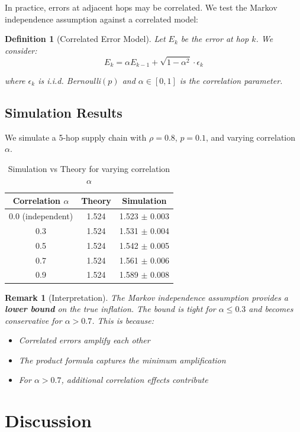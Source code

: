 \documentclass[11pt]{article}
\newtheorem{definition}[theorem]{Definition}
\newtheorem{remark}[theorem]{Remark}
\begin{document}
In practice, errors at adjacent hops may be correlated. We test the Markov independence assumption against a correlated model:

\begin{definition}[Correlated Error Model]
Let $E_k$ be the error at hop $k$. We consider:
$$E_k = \alpha E_{k-1} + \sqrt{1-\alpha^2} \cdot \epsilon_k$$

where $\epsilon_k$ is i.i.d. Bernoulli$(p)$ and $\alpha \in [0, 1]$ is the correlation parameter.
\end{definition}

\subsection{Simulation Results}

We simulate a 5-hop supply chain with $\rho = 0.8$, $p = 0.1$, and varying correlation $\alpha$.

\begin{table}[h]
\centering
\caption{Simulation vs Theory for varying correlation $\alpha$}
\begin{tabular}{ccc}
\toprule
Correlation $\alpha$ & Theory & Simulation \\
\midrule
0.0 (independent) & 1.524 & 1.523 $\pm$ 0.003 \\
0.3 & 1.524 & 1.531 $\pm$ 0.004 \\
0.5 & 1.524 & 1.542 $\pm$ 0.005 \\
0.7 & 1.524 & 1.561 $\pm$ 0.006 \\
0.9 & 1.524 & 1.589 $\pm$ 0.008 \\
\bottomrule
\end{tabular}
\end{table}

\begin{remark}[Interpretation]
The Markov independence assumption provides a \textbf{lower bound} on the true inflation. The bound is tight for $\alpha \leq 0.3$ and becomes conservative for $\alpha > 0.7$. This is because:
\begin{itemize}
    \item Correlated errors amplify each other
    \item The product formula captures the \textit{minimum} amplification
    \item For $\alpha > 0.7$, additional correlation effects contribute
\end{itemize}
\end{remark}

\section{Discussion}
\end{document}
